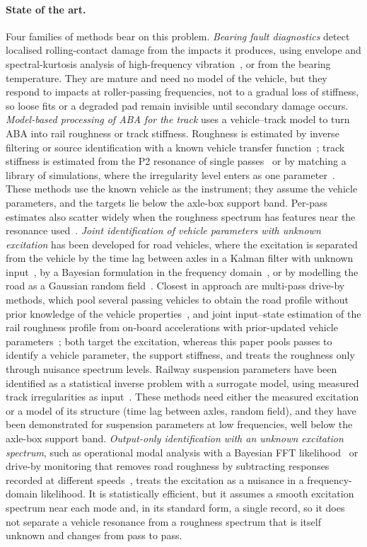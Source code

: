\paragraph{State of the art.} Four families of methods bear on this problem.
\emph{Bearing fault diagnostics} detect localised rolling-contact damage from the impacts it produces,
using envelope and spectral-kurtosis analysis of high-frequency vibration~\citep{randall2011}, or from
the bearing temperature. They are mature and need no model of the vehicle, but they respond to impacts
at roller-passing frequencies, not to a gradual loss of stiffness, so loose fits or a degraded pad
remain invisible until secondary damage occurs.
\emph{Model-based processing of ABA for the track} uses a vehicle--track model to turn ABA into rail
roughness or track stiffness. Roughness is estimated by inverse filtering or source identification
with a known vehicle transfer function~\citep{pieringer2022,carrigan2023}; track stiffness is estimated
from the P2 resonance of single passes~\citep{carrigan2023} or by matching a library of simulations,
where the irregularity level enters as one parameter~\citep{shen2023}. These methods use the known
vehicle as the instrument; they assume the vehicle parameters, and the targets lie below the
axle-box support band. Per-pass estimates also scatter widely when the roughness spectrum has features
near the resonance used~\citep{carrigan2023}.
\emph{Joint identification of vehicle parameters with unknown excitation} has been developed for road
vehicles, where the excitation is separated from the vehicle by the time lag between axles in a Kalman
filter with unknown input~\citep{liu2024}, by a Bayesian formulation in the frequency
domain~\citep{an2024}, or by modelling the road as a Gaussian random field~\citep{guo2026}.
Closest in approach are multi-pass drive-by methods, which pool several passing vehicles to obtain the road
profile without prior knowledge of the vehicle properties~\citep{keenahan2020}, and joint input--state
estimation of the rail roughness profile from on-board accelerations with prior-updated vehicle
parameters~\citep{stoura2023}; both target the excitation, whereas this paper pools passes to identify a
vehicle parameter, the support stiffness, and treats the roughness only through nuisance spectrum levels. Railway
suspension parameters have been identified as a statistical inverse problem with a surrogate model,
using measured track irregularities as input~\citep{lebel2019,lebelhal}. These methods need either the
measured excitation or a model of its structure (time lag between axles, random field), and they have
been demonstrated for suspension parameters at low frequencies, well below the axle-box support band.
\emph{Output-only identification with an unknown excitation spectrum}, such as operational modal
analysis with a Bayesian FFT likelihood~\citep{au2011} or drive-by monitoring that removes road
roughness by subtracting responses recorded at different speeds~\citep{jin2021}, treats the excitation as a nuisance
in a frequency-domain likelihood. It is statistically efficient, but it assumes a smooth excitation
spectrum near each mode and, in its standard form, a single record, so it does not separate a vehicle
resonance from a roughness spectrum that is itself unknown and changes from pass to pass.

